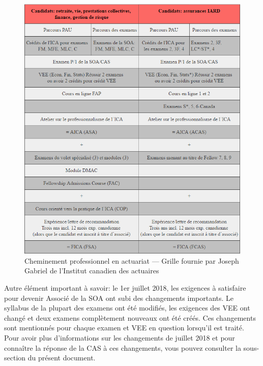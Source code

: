 \begin{center}
\begin{figure}[hp]
\includegraphics[width=1\textwidth]{tableau_ICA.png}
\caption{Cheminement professionnel en actuariat --- Grille fournie par Joseph Gabriel de l'Institut canadien des actuaires}
\end{figure}
\par
\end{center}


Autre élément important à savoir: le 1er juillet 2018, les exigences à satisfaire pour devenir Associé de la SOA ont subi des changements importants. Le syllabus de la plupart des examens ont été modifiés, les exigences des VEE ont changé et deux examens complètement nouveaux ont été créés. Ces changements sont mentionnés pour chaque examen et VEE en question lorsqu'il est traité. Pour avoir plus d'informations sur les changements de juillet 2018 et pour connaître la réponse de la CAS à ces changements, vous pouvez consulter la sous-section  du présent document. \vspace{\baselineskip}

